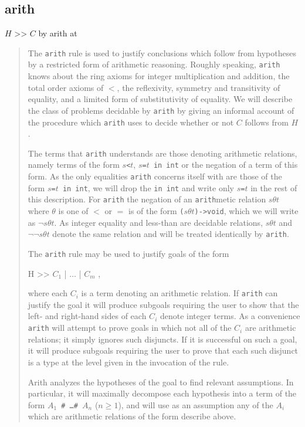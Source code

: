 \subsection*{arith}
\goal $H$ >> $C$ by arith at \Ui
\begin{quote}\rm
The {\tt arith} rule is used to justify conclusions which follow from
hypotheses by
a restricted form of arithmetic reasoning.  Roughly speaking, {\tt arith} knows
about the ring axioms for integer multiplication and addition, the total
order axioms of $<$, the reflexivity, symmetry and transitivity of equality, and
a limited form of substitutivity of equality.  We will describe the class
of problems decidable by {\tt arith} by giving an informal account of the
procedure which {\tt arith} uses to decide whether or not $C$ follows from $H$.

The terms that {\tt arith} understands are those denoting arithmetic relations,
namely terms of the form {\tt $s$<$t$}, {\tt $s$=$t$ in int}
or the negation of a term of this form.
As the only equalities {\tt arith} concerns itself with are those of the form
{\tt $s$=$t$ in int}, we will drop the {\tt in int} and write only
{\tt $s$=$t$} in the rest of this description.
For {\tt arith} the negation of an {\tt arith}metic relation $s \theta t$ where
$\theta$ is one of $<$ or $=$ is of the form 
{\tt ($s \theta t$)->void}, which we will write as $\neg s \theta t$.
As integer equality and less-than are decidable relations,
$s \theta t$ and $\neg \neg s \theta t$
denote the same relation and will be treated identically by {\tt arith}.

The {\tt arith} rule may be used to justify goals of the form

{\goal H >> $C_1$ | $\ldots$ | $C_m$ },

where each $C_i$ is a term denoting an arithmetic relation.  If {\tt arith}
can justify the goal it will produce subgoals requiring the user to show
that the left- and right-hand sides of each $C_i$ denote integer terms.
As a convenience {\tt arith} will attempt to prove goals in which not all
of the $C_i$ are arithmetic relations; it simply ignores such disjuncts.
If it is successful on such a goal, it will produce subgoals requiring the
user to prove that each such disjunct is a type at the level given in the
invocation of the rule.

Arith analyzes the hypotheses of the goal to find relevant assumptions.  In
particular, it will maximally decompose each hypothesis into a term of the
form {\tt $A_1$ \# \ldots \# $A_n$} ($n \ge 1$), and will use as an
assumption any of the $A_i$ which are arithmetic relations of the form
describe above.


\end{quote}
